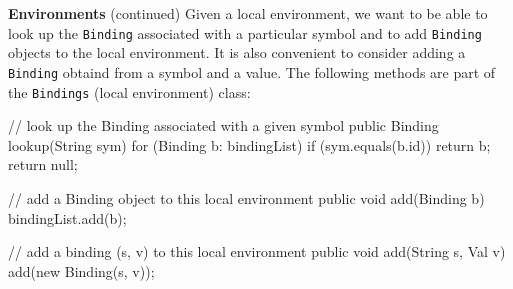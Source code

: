 \begin{minipage}[t]{\sw}
\slidenumber
\LARGE
{\bf Environments} (continued)\exx
Given a local environment,
we want to be able to look up the \verb'Binding' associated
with a particular symbol
and to add \verb'Binding' objects to the local environment.
It is also convenient to consider adding a \verb'Binding'
obtaind from a symbol and a value.
The following methods are part of the \verb'Bindings' (local environment) class:
{\Large
\begin{qv}
// look up the Binding associated with a given symbol
public Binding lookup(String sym) {
    for (Binding b: bindingList)
        if (sym.equals(b.id))
            return b;
    return null;
}

// add a Binding object to this local environment
public void add(Binding b) {
    bindingList.add(b);
}

// add a binding (s, v) to this local environment
public void add(String s, Val v) {
    add(new Binding(s, v));
}
\end{qv}
}
\end{minipage}
\clearpage
